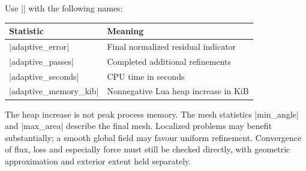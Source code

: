 Use |\femmstat| with the following names:
\begin{center}
\begin{tabular}{ll}
\toprule Statistic & Meaning\\
\midrule
|adaptive_error| & Final normalized residual indicator\\
|adaptive_passes| & Completed additional refinements\\
|adaptive_seconds| & CPU time in seconds\\
|adaptive_memory_kib| & Nonnegative Lua heap increase in KiB\\
\bottomrule
\end{tabular}
\end{center}
The heap increase is not peak process memory.
The mesh statistics |min_angle| and |max_area| describe the final mesh.
Localized problems may benefit substantially; a smooth global field may favour
uniform refinement. Convergence of flux, loss and especially force must still be
checked directly, with geometric approximation and exterior extent held separately.

\begin{codeexample}[width=5cm]
\end{codeexample}
